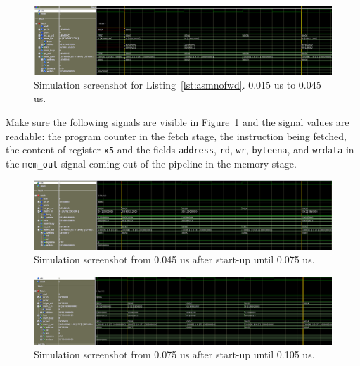 \documentclass[11pt,a4paper,titlepage,oneside]{article}
\begin{document}
\maketitle


\begin{figure}[ht!]
  \centering
  \includegraphics[width=1.0\linewidth]{fig/fetch_0_015_to_0_045.png}
  \caption{Simulation screenshot for Listing~\ref{lst:asmnofwd}. 0.015 us to 0.045 us. }
  \label{fig:sim}
\end{figure}

Make sure the following signals are visible in Figure~\ref{fig:sim} and the 
signal values are readable:
the program counter in the fetch stage, the instruction being fetched, the 
content of register \texttt{x5} and the fields \texttt{address}, \texttt{rd}, 
\texttt{wr}, \texttt{byteena}, and \texttt{wrdata} in the \texttt{mem\_out} 
signal coming out of the pipeline in the memory stage.

\begin{figure}[ht!]
	\centering
	\includegraphics[width=1.0\linewidth]{fig/fetch_0_045_to_0_075.png}
	\caption{Simulation screenshot from 0.045 us after start-up until 0.075 us.}
	\label{fig:sim_2}
\end{figure}

\begin{figure}[ht!]
	\centering
	\includegraphics[width=1.0\linewidth]{fig/fetch_0_075_to_0_105.png}
	\caption{Simulation screenshot from 0.075 us after start-up until 0.105 us.}
	\label{fig:sim_3}
\end{figure}
\end{document}
